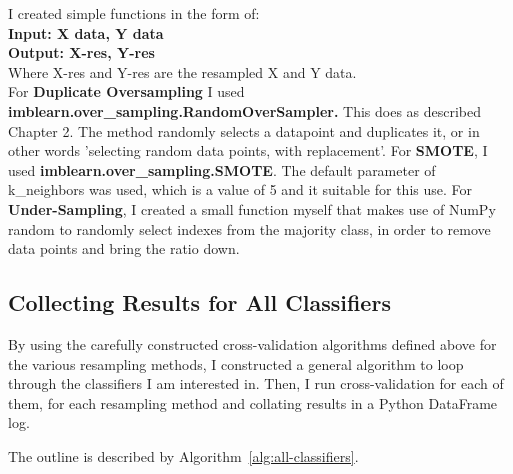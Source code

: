 \documentclass[12pt,a4paper,twoside]{report}
\begin{document}
I created simple functions in the form of:\\
\textbf{Input: X data, Y data}\\
\textbf{Output: X-res, Y-res}\\
Where X-res and Y-res are the resampled X and Y data. \\

For \textbf{Duplicate Oversampling} I used \textbf{imblearn.over\_sampling.RandomOverSampler.} This does as described Chapter 2. The method randomly selects a datapoint and duplicates it, or in other words 'selecting random data points, with replacement'.
For \textbf{SMOTE}, I used \textbf{imblearn.over\_sampling.SMOTE}. The default parameter of k\_neighbors was used, which is a value of 5 and it suitable for this use. 
For \textbf{Under-Sampling}, I created a small function myself that makes use of NumPy random to randomly select indexes from the majority class, in order to remove data points and bring the ratio down.

\subsection{Collecting Results for All Classifiers}
By using the carefully constructed cross-validation algorithms defined above for the various resampling methods, I constructed a general algorithm to loop through the classifiers I am interested in. Then, I run cross-validation for each of them, for each resampling method and collating results in a Python DataFrame log. 

The outline is described by Algorithm~\ref{alg:all-classifiers}.
\end{document}
